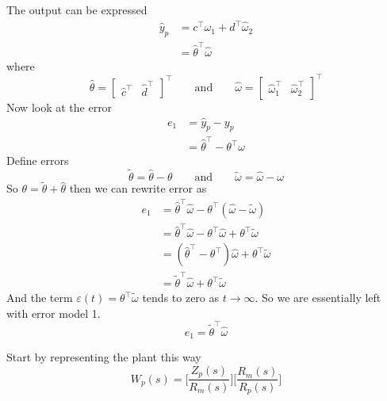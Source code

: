 The output can be expressed
\begin{align*}
  \widehat{y}_{p}&=c^{\top}\widehat{\omega}_{1}+d^{\top}\widehat{\omega}_{2} \\
  &=\widehat{\theta}^{\top}\widehat{\omega}
\end{align*}
where
\begin{equation*}
  \widehat{\theta}=
  \begin{bmatrix}
    \widehat{c}^{\top} & \widehat{d}^{\top}
  \end{bmatrix}^{\top}
  \qquad
  \text{and}
  \qquad
  \widehat{\omega}=
  \begin{bmatrix}
    \widehat{\omega}_{1}^{\top} & \widehat{\omega}_{2}^{\top}
  \end{bmatrix}^{\top}
\end{equation*}
Now look at the error
\begin{align*}
  e_{1}&=\widehat{y}_{p}-y_{p} \\
  &=\widehat{\theta}^{\top}-\theta^{\top}\omega
\end{align*}
Define errors
\begin{equation*}
  \widetilde{\theta}=\widehat{\theta}-\theta
  \qquad
  \text{and}
  \qquad
  \widetilde{\omega}=\widehat{\omega}-\omega
\end{equation*}
So $\theta=\widetilde{\theta}+\widehat{\theta}$ then we can rewrite error as
\begin{align*}
  e_{1}&=\widehat{\theta}^{\top}\widehat{\omega}-\theta^{\top}(\widehat{\omega}-\widetilde{\omega}) \\
  &=\widehat{\theta}^{\top}\widehat{\omega}-\theta^{\top}\widehat{\omega}+\theta^{\top}\widetilde{\omega} \\
  &=(\widehat{\theta}^{\top}-\theta^{\top})\widehat{\omega}+\theta^{\top}\widetilde{\omega} \\
  &=\widetilde{\theta}^{\top}\widehat{\omega}+\theta^{\top}\widetilde{\omega}
\end{align*}
And the term $\varepsilon(t)=\theta^{\top}\widetilde{\omega}$ tends to zero as $t\rightarrow\infty$.
So we are essentially left with error model 1.
\begin{equation*}
  e_{1}=\widetilde{\theta}^{\top}\widehat{\omega}
\end{equation*}

Start by representing the plant this way
\begin{equation*}
  W_{p}(s)=\biggr[\frac{Z_{p}(s)}{R_{m}(s)}\biggr]\biggr[\frac{R_{m}(s)}{R_{p}(s)}\biggr]
\end{equation*}


